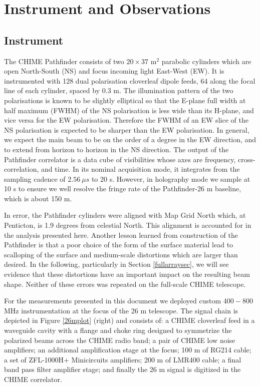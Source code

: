 \section{Instrument and Observations} \label{ch:hol:sec:io}

\subsection{Instrument} \label{ch:hol:sec:io:ss:i}

The CHIME Pathfinder\citep{chimepath1} consists of two $20\times37$ m$^2$ parabolic cylinders which are open North-South (NS) and focus incoming light East-West (EW). It is instrumented with 128 dual polarisation cloverleaf dipole feeds\citep{meiling}, 64 along the focal line of each cylinder, spaced by $0.3$ m. The illumination pattern of the two polarisations is known to be slightly elliptical so that the E-plane full width at half maximum (FWHM) of the NS polarisation is less wide than its H-plane, and vice versa for the EW polarisation. Therefore the FWHM of an EW slice of the NS polarisation is expected to be sharper than the EW polarisation. In general, we expect the main beam to be on the order of a degree in the EW direction, and to extend from horizon to horizon in the NS direction. The output of the Pathfinder correlator is a data cube of visibilities whose axes are frequency, cross-correlation, and time. In its nominal acquisition mode, it integrates from the sampling cadence of $2.56~\mu s$ to 20 s. However, in holography mode we sample at 10 s to ensure we well resolve the fringe rate of the Pathfinder-26 m baseline, which is about 150 m.

In error, the Pathfinder cylinders were aligned with Map Grid North which, at Penticton, is 1.9 degrees from celestial North. This alignment is accounted for in the analysis presented here. Another lesson learned from construction of the Pathfinder is that a poor choice of the form of the surface material lead to scalloping of the surface and medium-scale distortions which are larger than desired. In the following, particularly in Section \ref{fullarraysec}, we will see evidence that these distortions have an important impact on the resulting beam shape. Neither of these errors was repeated on the full-scale CHIME telescope.

For the measurements presented in this document we deployed custom $400-800$ MHz instrumentation at the focus of the 26 m telescope. The signal chain is depicted in Figure \ref{26mplot} (right) and consists of: a CHIME cloverleaf feed in a waveguide cavity with a flange and choke ring designed to symmetrize the polarized beams across the CHIME radio band; a pair of CHIME low noise amplifiers; an additional amplification stage at the focus; 100 m of RG214 cable; a set of ZFL-1000H+ Minicircuits amplifiers; 200 m of LMR400 cable; a final band pass filter amplifier stage; and finally the 26 m signal is digitized in the CHIME correlator.


